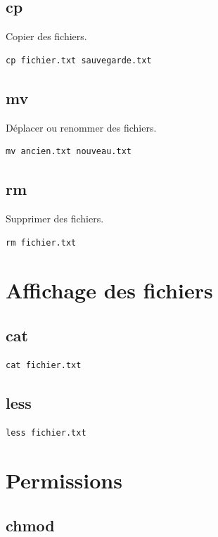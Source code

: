 \documentclass[12pt,a4paper]{report}
\begin{document}
\subsection*{cp}
Copier des fichiers.

\begin{lstlisting}
cp fichier.txt sauvegarde.txt
\end{lstlisting}

\subsection*{mv}
Déplacer ou renommer des fichiers.

\begin{lstlisting}
mv ancien.txt nouveau.txt
\end{lstlisting}

\subsection*{rm}
Supprimer des fichiers.

\begin{lstlisting}
rm fichier.txt
\end{lstlisting}

\section{Affichage des fichiers}

\subsection*{cat}

\begin{lstlisting}
cat fichier.txt
\end{lstlisting}

\subsection*{less}

\begin{lstlisting}
less fichier.txt
\end{lstlisting}

\section{Permissions}

\subsection*{chmod}
\end{document}
